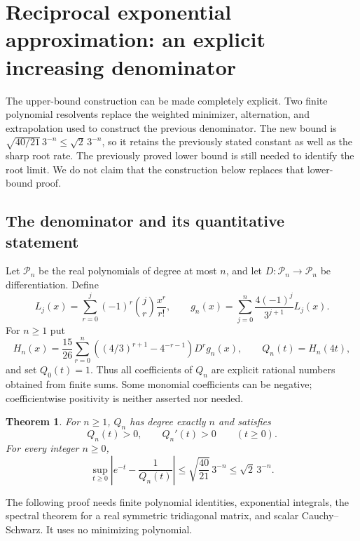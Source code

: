 \documentclass[11pt,a4paper]{article}
\newtheorem{theorem}{Theorem}[section]
\theoremstyle{definition}
\begin{document}
\tableofcontents
\clearpage


\section{Reciprocal exponential approximation: an explicit increasing denominator}
\label{sec:explicit-reciprocal}

The upper-bound construction can be made completely explicit. Two finite
polynomial resolvents replace the weighted minimizer, alternation, and
extrapolation used to construct the previous denominator. The new bound is
$\sqrt{40/21}\,3^{-n}\le\sqrt2\,3^{-n}$, so it retains the previously
stated constant as well as the sharp root rate.
The previously proved lower bound is still needed to identify the root limit.
We do not claim that the construction below replaces that lower-bound proof.

\subsection{The denominator and its quantitative statement}

Let $\mathcal P_n$ be the real polynomials of degree at most $n$, and let
$D:\mathcal P_n\to\mathcal P_n$ be differentiation. Define
\[
 L_j(x)=\sum_{r=0}^j(-1)^r\binom jr\frac{x^r}{r!},\qquad
 g_n(x)=\sum_{j=0}^n\frac{4(-1)^j}{3^{j+1}}L_j(x).
\]
For $n\ge1$ put
\begin{equation}\label{eq:explicit-denominator}
 H_n(x)=\frac{15}{26}\sum_{r=0}^n
       \left((4/3)^{r+1}-4^{-r-1}\right)D^r g_n(x),
 \qquad Q_n(t)=H_n(4t),
\end{equation}
and set $Q_0(t)=1$. Thus all coefficients of $Q_n$ are explicit rational
numbers obtained from finite sums. Some monomial coefficients can be negative;
coefficientwise positivity is neither asserted nor needed.

\begin{theorem}\label{thm:positive-reciprocal}
For $n\ge1$, $Q_n$ has degree exactly $n$ and satisfies
\[
 Q_n(t)>0,\qquad Q_n'(t)>0\qquad(t\ge0).
\]
For every integer $n\ge0$,
\begin{equation}\label{eq:explicit-reciprocal-error}
 \sup_{t\ge0}\left|e^{-t}-\frac1{Q_n(t)}\right|
 \le\sqrt{\frac{40}{21}}\,3^{-n}\le\sqrt2\,3^{-n}.
\end{equation}
\end{theorem}

The following proof needs finite polynomial identities, exponential integrals,
the spectral theorem for a real symmetric tridiagonal matrix, and scalar
Cauchy--Schwarz. It uses no minimizing polynomial.
\end{document}
